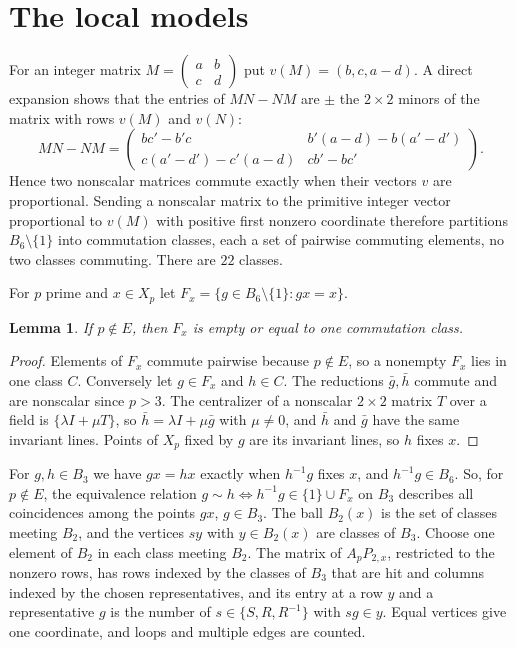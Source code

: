 \documentclass[11pt,a4paper]{article}
\numberwithin{equation}{section}
\newtheorem{lemma}[theorem]{Lemma}
\theoremstyle{remark}
\begin{document}
\section{The local models}\label{sec:models}

For an integer matrix $M=\left(\begin{smallmatrix}a&b\\c&d\end{smallmatrix}\right)$ put $v(M)=(b,c,a-d)$. A direct expansion shows that the entries of $MN-NM$ are $\pm$ the $2\times2$ minors of the matrix with rows $v(M)$ and $v(N)$:
\[
MN-NM=\begin{pmatrix} bc'-b'c & b'(a-d)-b(a'-d')\\ c(a'-d')-c'(a-d) & cb'-bc'\end{pmatrix}.
\]
Hence two nonscalar matrices commute exactly when their vectors $v$ are proportional. Sending a nonscalar matrix to the primitive integer vector proportional to $v(M)$ with positive first nonzero coordinate therefore partitions $B_6\setminus\{1\}$ into commutation classes, each a set of pairwise commuting elements, no two classes commuting. There are $22$ classes.

For $p$ prime and $x\in X_p$ let $F_x=\{g\in B_6\setminus\{1\}:gx=x\}$.

\begin{lemma}\label{lem:class}
If $p\notin E$, then $F_x$ is empty or equal to one commutation class.
\end{lemma}

\begin{proof}
Elements of $F_x$ commute pairwise because $p\notin E$, so a nonempty $F_x$ lies in one class $C$. Conversely let $g\in F_x$ and $h\in C$. The reductions $\bar g,\bar h$ commute and are nonscalar since $p>3$. The centralizer of a nonscalar $2\times2$ matrix $T$ over a field is $\{\lambda I+\mu T\}$, so $\bar h=\lambda I+\mu\bar g$ with $\mu\ne0$, and $\bar h$ and $\bar g$ have the same invariant lines. Points of $X_p$ fixed by $g$ are its invariant lines, so $h$ fixes $x$.
\end{proof}

For $g,h\in B_3$ we have $gx=hx$ exactly when $h^{-1}g$ fixes $x$, and $h^{-1}g\in B_6$. So, for $p\notin E$, the equivalence relation $g\sim h\iff h^{-1}g\in\{1\}\cup F_x$ on $B_3$ describes all coincidences among the points $gx$, $g\in B_3$. The ball $B_2(x)$ is the set of classes meeting $B_2$, and the vertices $sy$ with $y\in B_2(x)$ are classes of $B_3$. Choose one element of $B_2$ in each class meeting $B_2$. The matrix of $A_pP_{2,x}$, restricted to the nonzero rows, has rows indexed by the classes of $B_3$ that are hit and columns indexed by the chosen representatives, and its entry at a row $y$ and a representative $g$ is the number of $s\in\{S,R,R^{-1}\}$ with $sg\in y$. Equal vertices give one coordinate, and loops and multiple edges are counted.
\end{document}
